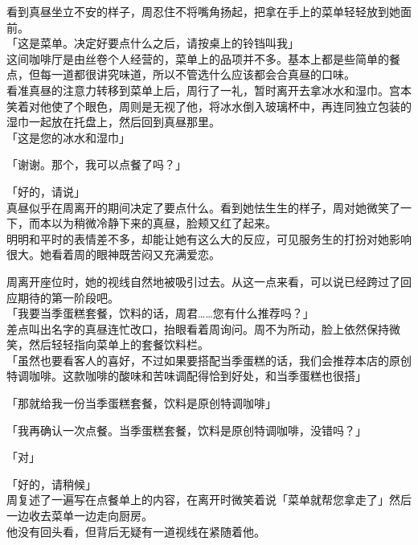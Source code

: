 看到真昼坐立不安的样子，周忍住不将嘴角扬起，把拿在手上的菜单轻轻放到她面前。\\

「这是菜单。决定好要点什么之后，请按桌上的铃铛叫我」\\

这间咖啡厅是由丝卷个人经营的，菜单上的品项并不多。基本上都是些简单的餐点，但每一道都很讲究味道，所以不管选什么应该都会合真昼的口味。\\

看准真昼的注意力转移到菜单上后，周行了一礼，暂时离开去拿冰水和湿巾。宫本笑着对他使了个眼色，周则是无视了他，将冰水倒入玻璃杯中，再连同独立包装的湿巾一起放在托盘上，然后回到真昼那里。\\

「这是您的冰水和湿巾」

「谢谢。那个，我可以点餐了吗？」

「好的，请说」\\

真昼似乎在周离开的期间决定了要点什么。看到她怯生生的样子，周对她微笑了一下，而本以为稍微冷静下来的真昼，脸颊又红了起来。\\

明明和平时的表情差不多，却能让她有这么大的反应，可见服务生的打扮对她影响很大。她看着周的眼神既苦闷又充满爱恋。

周离开座位时，她的视线自然地被吸引过去。从这一点来看，可以说已经跨过了回应期待的第一阶段吧。\\

「我要当季蛋糕套餐，饮料的话，周君……您有什么推荐吗？」\\

差点叫出名字的真昼连忙改口，抬眼看着周询问。周不为所动，脸上依然保持微笑，然后轻轻指向菜单上的套餐饮料栏。\\

「虽然也要看客人的喜好，不过如果要搭配当季蛋糕的话，我们会推荐本店的原创特调咖啡。这款咖啡的酸味和苦味调配得恰到好处，和当季蛋糕也很搭」

「那就给我一份当季蛋糕套餐，饮料是原创特调咖啡」

「我再确认一次点餐。当季蛋糕套餐，饮料是原创特调咖啡，没错吗？」

「对」

「好的，请稍候」\\

周复述了一遍写在点餐单上的内容，在离开时微笑着说「菜单就帮您拿走了」然后一边收去菜单一边走向厨房。\\

他没有回头看，但背后无疑有一道视线在紧随着他。\\


